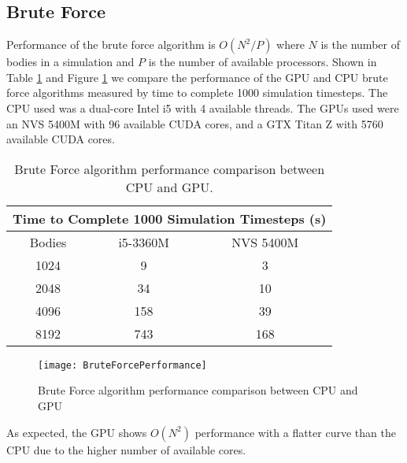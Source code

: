 \documentclass{thesis}
\begin{document}
\subsection{Brute Force}
Performance of the brute force algorithm is $O\left(N^2/P\right)$ where $N$ is the number of bodies in a simulation and $P$ is the number of available processors. Shown in Table \ref{tab:BruteForcePerformance} and Figure \ref{fig:BruteForcePerformance} we compare the performance of the GPU and CPU brute force algorithms measured by time to complete 1000 simulation timesteps. The CPU used was a dual-core Intel i5 with 4 available threads. The GPUs used were an NVS 5400M with 96 available CUDA cores, and a GTX Titan Z with 5760 available CUDA cores.
\begin{table}
    \centering
    \caption{Brute Force algorithm performance comparison between CPU and GPU.}
    \label{tab:BruteForcePerformance}
    \begin{tabular}{|c|||c||c|}
        \hline
        \multicolumn{3}{|c|}{Time to Complete 1000 Simulation Timesteps (s)}\\
        \hline
        Bodies & i5-3360M & NVS 5400M \\
        \hline
        1024 & 9 & 3\\
        2048 & 34 & 10\\
        4096 & 158 & 39\\
        8192 & 743 & 168\\
        \hline
    \end{tabular}
\end{table}
\begin{figure}[t]
    \caption{Brute Force algorithm performance comparison between CPU and GPU}
    \label{fig:BruteForcePerformance}
    \centering
    \texttt{[image: BruteForcePerformance]}
\end{figure}
As expected, the GPU shows $O(N^2)$ performance with a flatter curve than the CPU due to the higher number of available cores.
\end{document}
